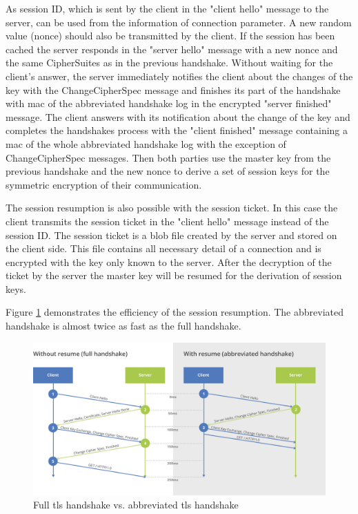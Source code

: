 As session ID, which is sent by the client in the "client hello" message to the server, can be used from the information of connection parameter. A new random value (nonce) should also be transmitted by the client. If the session has been cached the server responds in the "server hello" message with a new nonce and the same CipherSuites as in the previous handshake. Without waiting for the client's answer, the server immediately notifies the client about the changes of the key with the ChangeCipherSpec message and finishes its part of the handshake with \gls{mac} of the abbreviated handshake log in the encrypted "server finished" message. The client answers with its notification about the change of the key and completes the handshakes process with the "client finished" message containing a \gls{mac} of the whole abbreviated handshake log with the exception of ChangeCipherSpec messages. Then both parties use the master key from the previous handshake and the new nonce to derive a set of session keys for the symmetric encryption of their communication.

The session resumption is also possible with the session ticket. In this case the client transmits the session ticket in the "client hello" message instead of the session ID. The session ticket is a blob file created by the server and stored on the client side. This file contains all necessary detail of a connection and is encrypted with the key only known to the server. After the decryption of the ticket by the server the master key will be resumed for the derivation of session keys.

Figure \ref{fig:without-with-resume-1_2} demonstrates the efficiency of the session resumption. The abbreviated handshake is almost twice as fast as the full handshake.

\begin{figure}[H]
	\centering
		\includegraphics[scale=0.4]{images/without-with-resume-1_2.png}
	\caption{Full \gls{tls} handshake vs. abbreviated \gls{tls} handshake \cite{cloudflare:resume}}
	\label{fig:without-with-resume-1_2}
\end{figure}

